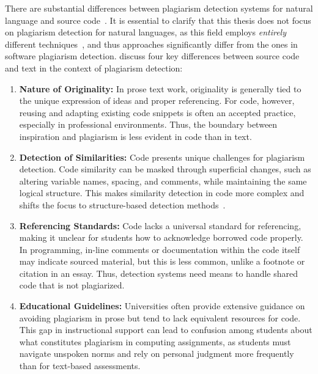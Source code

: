 There are substantial differences between plagiarism detection systems for natural language and source code~\cite{Fincher2019, Simon2013, Simon2014b}.
It is essential to clarify that this thesis does not focus on plagiarism detection for natural languages, as this field employs \textit{entirely} different techniques~\cite{Lancaster2005}, and thus approaches significantly differ from the ones in software plagiarism detection.
%
\citet{Simon2013} discuss four key differences between source code and text in the context of plagiarism detection:
\begin{enumerate}
    \item \textbf{Nature of Originality:} In prose text work, originality is generally tied to the unique expression of ideas and proper referencing. For code, however, reusing and adapting existing code snippets is often an accepted practice, especially in professional environments. Thus, the boundary between inspiration and plagiarism is less evident in code than in text.
    \item \textbf{Detection of Similarities:} Code presents unique challenges for plagiarism detection. Code similarity can be masked through superficial changes, such as altering variable names, spacing, and comments, while maintaining the same logical structure. This makes similarity detection in code more complex and shifts the focus to structure-based detection methods~\cite{Nichols2019}.
    \item \textbf{Referencing Standards:} Code lacks a universal standard for referencing, making it unclear for students how to acknowledge borrowed code properly. In programming, in-line comments or documentation within the code itself may indicate sourced material, but this is less common, unlike a footnote or citation in an essay. Thus, detection systems need means to handle shared code that is not plagiarized.
    \item \textbf{Educational Guidelines:} Universities often provide extensive guidance on avoiding plagiarism in prose but tend to lack equivalent resources for code. This gap in instructional support can lead to confusion among students about what constitutes plagiarism in computing assignments, as students must navigate unspoken norms and rely on personal judgment more frequently than for text-based assessments.
\end{enumerate}

